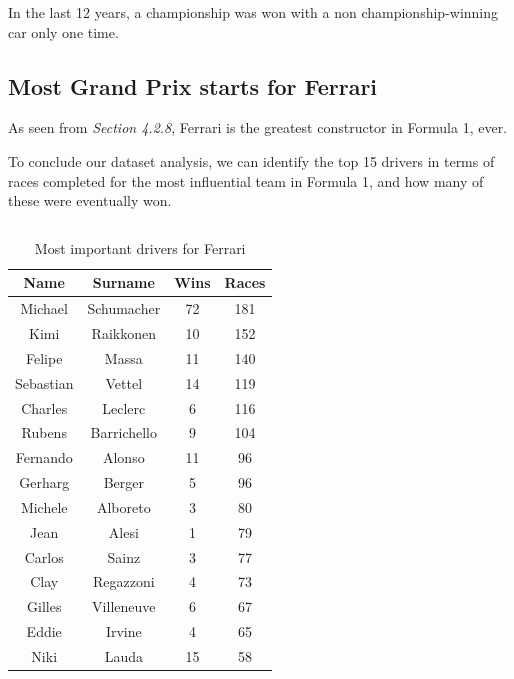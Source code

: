 \documentclass{Configuration_Files/PoliMi3i_thesis}
\begin{document}
In the last 12 years, a championship was won with a non championship-winning car only one time.


\subsection{Most Grand Prix starts for Ferrari}
As seen from \textit{Section 4.2.8}, Ferrari is the greatest constructor in Formula 1, ever.

To conclude our dataset analysis, we can identify the top 15 drivers in terms of races completed for the most influential team in Formula 1, and how many of these were eventually won.

\vspace{0.5cm}
\inputminted[frame=single,framesep=10pt,breaklines]{python}{formula1/queries/query10.py}

\vspace{0.5cm}
\begin{table}[!h]
    \centering
    \begin{tabular}{|c|c|c|c|}
        \hline
        \textbf{Name} & \textbf{Surname} & \textbf{Wins} & \textbf{Races} \\
        \hline
        Michael & Schumacher & 72 & 181 \\
        Kimi & Raikkonen & 10 & 152 \\
        Felipe & Massa & 11 & 140 \\
        Sebastian & Vettel & 14 & 119 \\
        Charles & Leclerc & 6 & 116 \\
        Rubens & Barrichello & 9 & 104 \\
        Fernando & Alonso & 11 & 96 \\
        Gerharg & Berger & 5 & 96 \\
        Michele & Alboreto & 3 & 80 \\
        Jean & Alesi & 1 & 79 \\
        Carlos & Sainz & 3 & 77 \\
        Clay & Regazzoni & 4 & 73 \\
        Gilles & Villeneuve & 6 & 67 \\
        Eddie & Irvine & 4 & 65 \\
        Niki & Lauda & 15 & 58 \\
        \hline
    \end{tabular}
    \caption{Most important drivers for Ferrari}
\end{table}


\cleardoublepage

\listoffigures

\listoftables

\cleardoublepage
\end{document}
